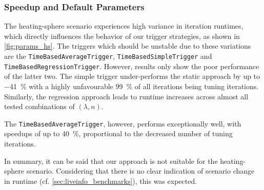 

\subsubsection{Speedup and Default Parameters}
The heating-sphere scenario experiences high variance in iteration runtimes, which directly influences the behavior of our trigger strategies, as shown in \autoref{fig:params_hs}. The triggers which should be unstable due to these variations are the \texttt{TimeBasedAverageTrigger}, \texttt{TimeBasedSimpleTrigger} and \texttt{TimeBasedRegressionTrigger}. However, results only show the poor performance of the latter two. The simple trigger under-performs the static approach by up to \qty{-41}{\percent} with a highly unfavourable \qty{99}{\percent} of all iterations being tuning iterations. Similarly, the regression approach leads to runtime increases across almost all tested combinations of $(\lambda, n)$.

The \texttt{TimeBasedAverageTrigger}, however, performs exceptionally well, with speedups of up to \qty{40}{\percent}, proportional to the decreased number of tuning iterations. %

In summary, it can be said that our approach is not suitable for the heating-sphere scenario. Considering that there is no clear indication of scenario change in runtime (cf. \autoref{sec:liveinfo_benchmarks}), this was expected.




